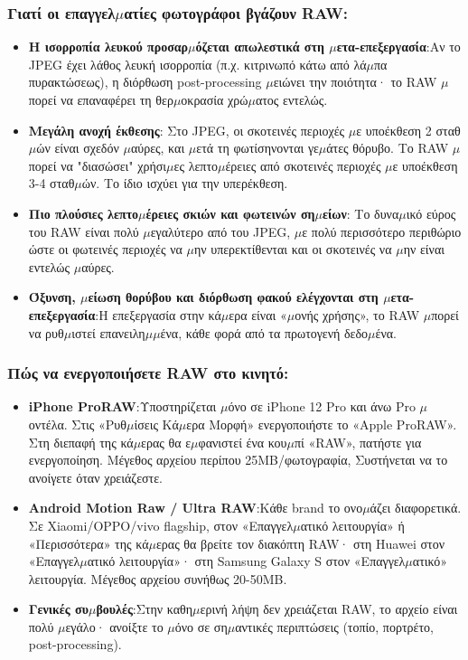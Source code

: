 \subsubsection*{Γιατί οι επαγγελ$\mu$ατίες φωτογράφοι βγάζουν RAW:}

\begin{itemize}
  \item \textbf{Η ισορροπία λευκού προσαρ$\mu$όζεται απωλεστικά στη $\mu$ετα-επεξεργασία}:Αν το JPEG έχει λάθος λευκή ισορροπία (π.χ. κιτρινωπό κάτω από λά$\mu$πα πυρακτώσεως), η διόρθωση post-processing $\mu$ειώνει την ποιότητα· το RAW $\mu$πορεί να επαναφέρει τη θερ$\mu$οκρασία χρώ$\mu$ατος εντελώς.
  \item \textbf{Μεγάλη ανοχή έκθεσης}: Στο JPEG, οι σκοτεινές περιοχές $\mu$ε υποέκθεση 2 σταθ$\mu$ών είναι σχεδόν $\mu$αύρες, και $\mu$ετά τη φωτίσηνονται γε$\mu$άτες θόρυβο. Το RAW $\mu$πορεί να "διασώσει" χρήσι$\mu$ες λεπτο$\mu$έρειες από σκοτεινές περιοχές $\mu$ε υποέκθεση 3-4 σταθ$\mu$ών. Το ίδιο ισχύει για την υπερέκθεση.
  \item \textbf{Πιο πλούσιες λεπτο$\mu$έρειες σκιών και φωτεινών ση$\mu$είων}: Το δυνα$\mu$ικό εύρος του RAW είναι πολύ $\mu$εγαλύτερο από του JPEG, $\mu$ε πολύ περισσότερο περιθώριο ώστε οι φωτεινές περιοχές να $\mu$ην υπερεκτίθενται και οι σκοτεινές να $\mu$ην είναι εντελώς $\mu$αύρες.
  \item \textbf{Όξυνση, $\mu$είωση θορύβου και διόρθωση φακού ελέγχονται στη $\mu$ετα-επεξεργασία}:Η επεξεργασία στην κά$\mu$ερα είναι «$\mu$ονής χρήσης», το RAW $\mu$πορεί να ρυθ$\mu$ιστεί επανειλη$\mu$$\mu$ένα, κάθε φορά από τα πρωτογενή δεδο$\mu$ένα.
\end{itemize}

\subsubsection*{Πώς να ενεργοποιήσετε RAW στο κινητό:}

\begin{itemize}
  \item \textbf{iPhone ProRAW}:Υποστηρίζεται $\mu$όνο σε iPhone 12 Pro και άνω Pro $\mu$οντέλα. Στις «Ρυθ$\mu$ίσεις Κά$\mu$ερα Μορφή» ενεργοποιήστε το «Apple ProRAW». Στη διεπαφή της κά$\mu$ερας θα ε$\mu$φανιστεί ένα κου$\mu$πί «RAW», πατήστε για ενεργοποίηση. Μέγεθος αρχείου περίπου 25MB/φωτογραφία, Συστήνεται να το ανοίγετε όταν χρειάζεστε.
  \item \textbf{Android Motion Raw / Ultra RAW}:Κάθε brand το ονο$\mu$άζει διαφορετικά. Σε Xiaomi/OPPO/vivo flagship, στον «Επαγγελ$\mu$ατικό λειτουργία» ή «Περισσότερα» της κά$\mu$ερας θα βρείτε τον διακόπτη RAW· στη Huawei στον «Επαγγελ$\mu$ατικό λειτουργία»· στη Samsung Galaxy S στον «Επαγγελ$\mu$ατικό» λειτουργία. Μέγεθος αρχείου συνήθως 20-50MB.
  \item \textbf{Γενικές συ$\mu$βουλές}:Στην καθη$\mu$ερινή λήψη δεν χρειάζεται RAW, το αρχείο είναι πολύ $\mu$εγάλο· ανοίξτε το $\mu$όνο σε ση$\mu$αντικές περιπτώσεις (τοπίο, πορτρέτο, post-processing).
\end{itemize}

